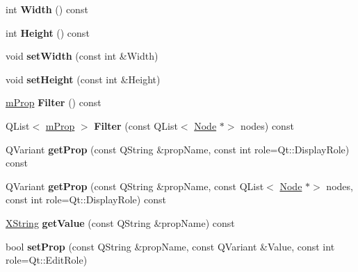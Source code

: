 \begin{DoxyCompactItemize}
\item 
\mbox{\label{class_node_a330010a6a9297b8fe467414a16bf3cda}} 
int {\bfseries Width} () const
\item 
\mbox{\label{class_node_ade605979719283a6b00b877e349d76fb}} 
int {\bfseries Height} () const
\item 
\mbox{\label{class_node_a3b25cddb17e55bbd728cb26df920426b}} 
void {\bfseries set\+Width} (const int \&Width)
\item 
\mbox{\label{class_node_a5f473b71eb08e5d72b862d36e294079c}} 
void {\bfseries set\+Height} (const int \&Height)
\item 
\mbox{\label{class_node_ad9ca2cb4534cb8c0167d3836a4d0b11b}} 
\hyperlink{classm_prop}{m\+Prop} {\bfseries Filter} () const
\item 
\mbox{\label{class_node_a1dda0bc1c44bc8b14119d111e037a193}} 
Q\+List$<$ \hyperlink{classm_prop}{m\+Prop} $>$ {\bfseries Filter} (const Q\+List$<$ \hyperlink{class_node}{Node} $\ast$$>$ nodes) const
\item 
\mbox{\label{class_node_ad669a1f8e075cbee76da51075d6f3a22}} 
Q\+Variant {\bfseries get\+Prop} (const Q\+String \&prop\+Name, const int role=Qt\+::\+Display\+Role) const
\item 
\mbox{\label{class_node_a4167aea31aee47f272bed2e86f6128c2}} 
Q\+Variant {\bfseries get\+Prop} (const Q\+String \&prop\+Name, const Q\+List$<$ \hyperlink{class_node}{Node} $\ast$$>$ nodes, const int role=Qt\+::\+Display\+Role) const
\item 
\mbox{\label{class_node_ad894ffe949a3af71de38af0cee64aaab}} 
\hyperlink{class_x_string}{X\+String} {\bfseries get\+Value} (const Q\+String \&prop\+Name) const
\item 
\mbox{\label{class_node_a5c7936111fc0e7247267c69c911f96c0}} 
bool {\bfseries set\+Prop} (const Q\+String \&prop\+Name, const Q\+Variant \&Value, const int role=Qt\+::\+Edit\+Role)
\item 
\mbox{\label{class_node_a7a1df9d234e2dc7e3cd517957d03a5f9}} 

\end{DoxyCompactItemize}
